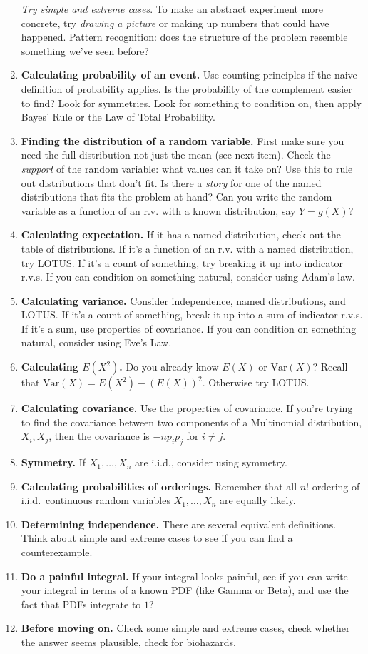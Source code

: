 \documentclass[6pt,landscape]{article}
\newcommand{\var}{\textrm{Var}}
\begin{document}
\begin{multicols*}{3}
\begin{enumerate}
\emph{Try simple and extreme cases}. To make an abstract experiment more concrete, try \emph{drawing a picture} or making up numbers that could have happened. Pattern recognition: does the structure of the problem resemble something we've seen before?
\item \textbf{Calculating probability of an event.} Use counting principles if the naive definition of probability applies. Is the probability of the complement easier to find? Look for symmetries. Look for something to condition on, then apply Bayes' Rule or the Law of Total Probability. 
\item \textbf{Finding the distribution of a random variable.} First make sure you need the full distribution not just the mean (see next item). Check the \emph{support} of the random variable: what values can it take on? Use this to rule out distributions that don't fit.  Is there a \emph{story} for one of the named distributions that fits the problem at hand?  Can you write the random variable as a function of an r.v. with a known distribution, say $Y = g(X)$?
\item \textbf{Calculating expectation.} If it has a named distribution, check out the table of distributions. If it's a function of an r.v. with a named distribution, try LOTUS. If it's a count of something, try breaking it up into indicator r.v.s. If you can condition on something natural, consider using Adam's law. 
\item \textbf{Calculating variance.} Consider independence, named distributions, and LOTUS. If it's a count of something, break it up into a sum of indicator r.v.s. If it's a sum, use properties of covariance. If you can condition on something natural, consider using Eve's Law.
\item \textbf{Calculating $E(X^2)$.}  Do you already know $E(X)$ or $\var(X)$? Recall that $\var(X) = E(X^2) - (E(X))^2$. Otherwise try LOTUS.
\item \textbf{Calculating covariance.} Use the properties of covariance. If you're trying to find the covariance between two components of a Multinomial distribution, $X_i, X_j$, then the covariance is $-np_ip_j$ for $i \neq j$.
\item \textbf{Symmetry.} If $X_1,\dots,X_n$ are i.i.d., consider using symmetry.
\item \textbf{Calculating probabilities of orderings.} Remember that all $n!$ ordering of i.i.d.~continuous random variables $X_1,\dots,X_n$ are equally likely.
\item \textbf{Determining independence.} There are several equivalent definitions. Think about simple and extreme cases to see if you can find a counterexample.
\item \textbf{Do a painful integral.} If your integral looks painful, see if you can write your integral in terms of a known PDF (like Gamma or Beta), and use the fact that PDFs integrate to $1$?
\item \textbf{Before moving on.} Check some simple and extreme cases, check whether the answer seems plausible, check for biohazards.\end{enumerate}



\end{multicols*}
\end{document}
